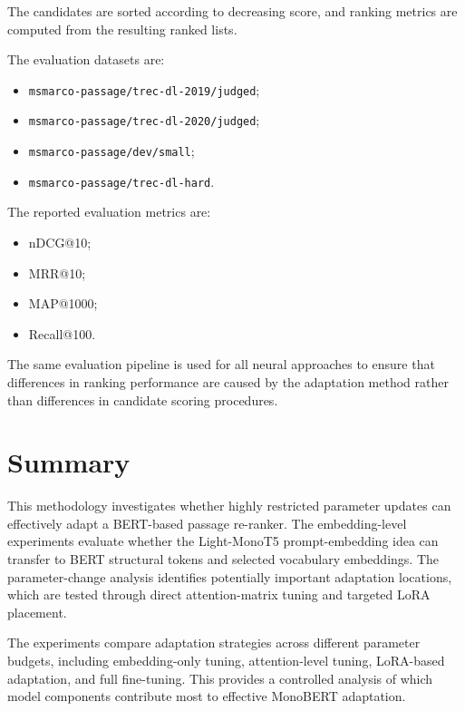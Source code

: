 The candidates are sorted according to decreasing score, and ranking metrics are computed from the resulting ranked lists.

The evaluation datasets are:

\begin{itemize}
    \item \texttt{msmarco-passage/trec-dl-2019/judged};
    \item \texttt{msmarco-passage/trec-dl-2020/judged};
    \item \texttt{msmarco-passage/dev/small};
    \item \texttt{msmarco-passage/trec-dl-hard}.
\end{itemize}

The reported evaluation metrics are:

\begin{itemize}
    \item nDCG@10;
    \item MRR@10;
    \item MAP@1000;
    \item Recall@100.
\end{itemize}

The same evaluation pipeline is used for all neural approaches to ensure that differences in ranking performance are caused by the adaptation method rather than differences in candidate scoring procedures.

\section{Summary}
\label{sec:methodology_summary}

This methodology investigates whether highly restricted parameter updates can effectively adapt a BERT-based passage re-ranker. The embedding-level experiments evaluate whether the Light-MonoT5 prompt-embedding idea can transfer to BERT structural tokens and selected vocabulary embeddings. The parameter-change analysis identifies potentially important adaptation locations, which are tested through direct attention-matrix tuning and targeted LoRA placement.

The experiments compare adaptation strategies across different parameter budgets, including embedding-only tuning, attention-level tuning, LoRA-based adaptation, and full fine-tuning. This provides a controlled analysis of which model components contribute most to effective MonoBERT adaptation.